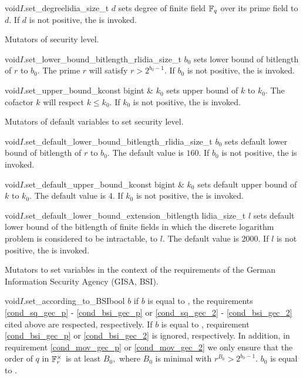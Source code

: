 \begin{fcode}{void}{$I$.set_degree}{lidia_size_t $d$}
  sets degree of finite field $\mathbb{F}_q$ over its prime field to $d.$
  If $d$ is not positive, the
   is invoked.
\end{fcode}

Mutators of security level.

\begin{fcode}{void}{$I$.set_lower_bound_bitlength_r}{lidia_size_t $b_0$}
  sets lower bound of bitlength of $r$ to $b_0.$ The
  prime $r$ will satisfy $r>2^{b_0-1}.$ If $b_0$ is not positive, the
   is invoked.
\end{fcode}

\begin{fcode}{void}{$I$.set_upper_bound_k}{const bigint & $k_0$}
  sets upper bound of $k$ to $k_0.$ The
  cofactor $k$ will respect $k\leq k_0.$ If $k_0$ is not positive, the
   is invoked.
\end{fcode}

Mutators of default variables to set security level.

\begin{fcode}{void}{$I$.set_default_lower_bound_bitlength_r}{lidia_size_t $b_0$}
  sets default lower bound of bitlength of $r$ to $b_0.$ The default
  value is $160.$ If $b_0$ is not positive, the
   is invoked.
\end{fcode}

\begin{fcode}{void}{$I$.set_default_upper_bound_k}{const bigint & $k_0$}
  sets default upper bound of $k$ to $k_0.$ The default
  value is $4.$ If $k_0$ is not positive, the
   is invoked.
\end{fcode}

\begin{fcode}{void}{$I$.set_default_lower_bound_extension_bitlength}
{lidia_size_t $l$}
  sets default lower bound of the bitlength of finite fields
  in which the discrete logarithm problem is considered to be
  intractable, to $l.$ The default value is $2000.$ If $l$
  is not positive, the
   is invoked.
\end{fcode}

Mutators to set variables in the context of
the requirements of the German Information Security
Agency (GISA, BSI).

\begin{fcode}{void}{$I$.set_according_to_BSI}{bool $b$}
  if $b$ is equal to , the requirements
  \ref{cond_sq_gec_p} - \ref{cond_bsi_gec_p} or
  \ref{cond_sq_gec_2} - \ref{cond_bsi_gec_2} cited above are respected,
  respectively.
  If $b$ is equal to , requirement \ref{cond_bsi_gec_p} or
  \ref{cond_bsi_gec_2} is ignored, respectively.
  In addition, in requirement \ref{cond_mov_gec_p} or \ref{cond_mov_gec_2}
  we only ensure that the order
  of $q$ in $\mathbb{F}_r^\times$ is at least $B_0,$ where
  $B_0$ is minimal with $r^{B_0}>2^{b_0-1}.$
  $b_0$ is equal to .
\end{fcode}

